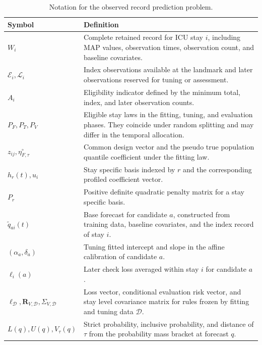 \begin{table}[!htbp]
\caption{Notation for the observed record prediction problem.}
\label{tab:supp_notation}
\centering
\small
\setlength{\tabcolsep}{5pt}
\begin{tabular}{>{\raggedright\arraybackslash}p{}>{\raggedright\arraybackslash}p{}}
\toprule
Symbol & Definition\\
\midrule
$W_i$ & Complete retained record for ICU stay $i$, including MAP values, observation times, observation count, and baseline covariates.\\
$\mathcal E_i,\mathcal L_i$ & Index observations available at the landmark and later observations reserved for tuning or assessment.\\
$A_i$ & Eligibility indicator defined by the minimum total, index, and later observation counts.\\
$P_F,P_T,P_V$ & Eligible stay laws in the fitting, tuning, and evaluation phases. They coincide under random splitting and may differ in the temporal allocation.\\
$z_{ij},\eta_{F,\tau}^{\circ}$ & Common design vector and the pseudo true population quantile coefficient under the fitting law.\\
$h_r(t),u_i$ & Stay specific basis indexed by $r$ and the corresponding profiled coefficient vector.\\
$P_r$ & Positive definite quadratic penalty matrix for a stay specific basis.\\
$\widetilde q_{ai}(t)$ & Base forecast for candidate $a$, constructed from training data, baseline covariates, and the index record of stay $i$.\\
$(\alpha_a,\delta_a)$ & Tuning fitted intercept and slope in the affine calibration of candidate $a$.\\
$\ell_i(a)$ & Later check loss averaged within stay $i$ for candidate $a$.\\
$\boldsymbol\ell_{\mathcal D},\mathbf R_{V,\mathcal D},\Sigma_{V,\mathcal D}$ & Loss vector, conditional evaluation risk vector, and stay level covariance matrix for rules frozen by fitting and tuning data $\mathcal D$.\\
$L(q),U(q),V_\tau(q)$ & Strict probability, inclusive probability, and distance of $\tau$ from the probability mass bracket at forecast $q$.\\
\bottomrule
\end{tabular}
\end{table}
